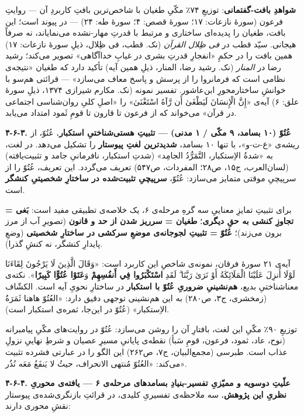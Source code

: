\begin{RTL}
\begin{otherlanguage}{persian}
\textbf{شواهدِ بافت-گفتمانی}: توزیعِ ۷۴٪ مکّیِ طغیان با شاخص‌ترین بافتِ کاربردِ
آن --- روایتِ فرعون (سورۀ نازعات: ۱۷؛ سورۀ قصص: ۴؛ سورۀ طه: ۲۴) --- در
پیوند است؛ این بافت، طغیان را پدیده‌ای ساختاری و مرتبط با قدرتِ مهار-نشده
می‌نمایاند، نه صرفاً هیجانی. سیّد قطب در \emph{فی ظِلال القرآن} (نک. قطب، فی
ظِلال، ذیلِ سورۀ نازعات: ۱۷) همین بافت را در حکمِ «انفجارِ قدرتِ بشری در غیابِ
خداآگاهی» تصویر می‌کند؛ رشید رضا در \emph{المنار} (نک. رشید رضا، المنار،
ذیلِ همین آیه) تأکید دارد که طغیان «نتیجه‌ی نظامی است که فرمانروا را از
پرسش و پاسخ معاف می‌سازد» --- قرائتی هم‌سو با خوانشِ ساختارمحورِ ابن‌عاشور.
تفسیر نمونه (نک. مکارم شیرازی ۱۳۷۴، ذیلِ سورۀ علق: ۶) آیه‌ی «إِنَّ الْإِنسَانَ
لَيَطْغَىٰ أَن رَّآهُ اسْتَغْنَىٰ» را «اصلِ کلیِ روان‌شناسی اجتماعی در قرآن» می‌خواند که
از فرعون تا قارون تا قومِ ثَمود امتداد می‌یابد.

\textbf{۴-۶-۳. عُتُوّ (۱۰ بسامد، ۹ مکّی / ۱ مدنی) --- تثبیتِ هستی‌شناختیِ
استکبار.} عُتُوّ، از ریشه‌ی «ع-ت-و»، با تنها ۱۰ بسامد، \textbf{شدیدترین لغتِ
پیوستار} را تشکیل می‌دهد. در لغت، به «شدةُ الاِستکبار، التَّمَرُّدُ الجامِد» (شدتِ
استکبار، نافرمانیِ جامد و تثبیت‌یافته) (لسان‌العرب، ج۱۵، ص۲۸؛ المفردات،
ص۵۴۷) تعریف می‌گردد. این تعریف، عُتُوّ را از سرپیچیِ موقتی متمایز می‌سازد:
عُتُوّ، \textbf{سرپیچیِ تثبیت‌شده در ساختارِ شخصیتیِ کنشگر} است.

برای تثبیتِ تمایزِ معناییِ سه گرهِ مرحله‌ی ۶، یک خلاصه‌ی تطبیقی مفید است:
\textbf{بَغی = تجاوزِ کنشی به حقِ دیگری}؛ \textbf{طغیان = سرریز شدن از حد و
قانون} (تصویرِ آب از مرز برون می‌زند)؛ \textbf{عُتُوّ = تثبیتِ لجوجانه‌ی موضعِ
سرکشی در ساختارِ شخصیتی} (وضعِ پایدارِ کنشگر، نه کنشِ گذرا).

آیه‌ی ۲۱ سورۀ فرقان، نمونه‌ی شاخصِ این کاربرد است: «وَقَالَ الَّذِينَ لَا يَرْجُونَ
لِقَاءَنَا لَوْلَا أُنزِلَ عَلَيْنَا الْمَلَائِكَةُ أَوْ نَرَىٰ رَبَّنَا ۗ لَقَدِ \textbf{اسْتَكْبَرُوا فِي
أَنفُسِهِمْ} وَ\textbf{عَتَوْا عُتُوًّا كَبِيرًا}». نکته‌ی معناشناختیِ بدیع،
\textbf{هم‌نشینیِ ضروریِ عُتُوّ با استکبار} در ساختارِ نحویِ آیه است. الکشّاف
(زمخشری، ج۳، ص۲۸۰) به این هم‌نشینی توجهی دقیق دارد: «العُتُوّ هاهنا ثَمَرَةُ
الاِستکبار» (عُتُوّ در این‌جا، ثمره‌ی استکبار است).

توزیعِ ۹۰٪ مکّیِ این لغت، بافتارِ آن را روشن می‌سازد: عُتُوّ در روایت‌های مکّیِ
پیامبرانه (نوح، عاد، ثمود، فرعون، قومِ سَبأ) نقطه‌ی پایانیِ مسیرِ عصیان و شرطِ
نهاییِ نزولِ عذاب است. طبرسی (مجمع‌البیان، ج۷، ص۲۶۲) این الگو را در عبارتی
فشرده تثبیت می‌کند: «العُتُوّ مُنتهی الانحراف، حیثُ لا یَنفَعُ مَعَه نُذُر».

\textbf{۴-۶-۴. علّیتِ دوسویه و ممیّزیِ تفسیر-بنیادِ بسامدهای مرحله‌ی ۶ ---
یافته‌ی محوریِ نظریِ این پژوهش.} سه ملاحظه‌ی تفسیریِ کلیدی، در قرائتِ
بازنگری‌شده‌ی پیوستار نقشِ محوری دارند:


\end{otherlanguage}
\end{RTL}

